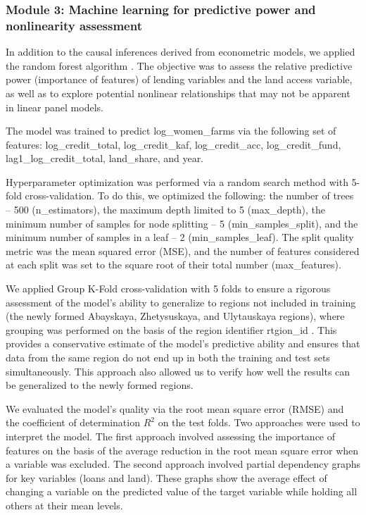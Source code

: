 ﻿\documentclass[pdflatex,sn-mathphys-ay]{sn-jnl}
\begin{document}
\subsubsection{Module 3: Machine learning for predictive power and nonlinearity assessment}

In addition to the causal inferences derived from econometric models, we
applied the random forest algorithm \citep{ref83}. The
objective was to assess the relative predictive power (importance of
features) of lending variables and the land access variable, as well as
to explore potential nonlinear relationships that may not be apparent in
linear panel models.

The model was trained to predict log\_women\_farms via the following
set of features: log\_credit\_total, log\_credit\_kaf, log\_credit\_acc,
log\_credit\_fund, lag1\_log\_credit\_total, land\_share, and year.

Hyperparameter optimization was performed via a random search method
with 5-fold cross-validation. To do this, we optimized the following:
the number of trees -- 500 (n\_estimators), the maximum depth limited to
5 (max\_depth), the minimum number of samples for node splitting -- 5
(min\_samples\_split), and the minimum number of samples in a leaf -- 2
(min\_samples\_leaf). The split quality metric was the mean squared
error (MSE), and the number of features considered at each split was set
to the square root of their total number (max\_features).

We applied Group K-Fold cross-validation with 5 folds to ensure a
rigorous assessment of the model's ability to generalize to regions not
included in training (the newly formed Abayskaya, Zhetysuskaya, and
Ulytauskaya regions), where grouping was performed on the basis of the region
identifier rtgion\_id \citep{ref65}. This provides a
conservative estimate of the model's predictive ability and ensures that
data from the same region do not end up in both the training and test
sets simultaneously. This approach also allowed us to verify how well the results
can be generalized to the newly formed regions.

We evaluated the model's quality via the root mean square error (RMSE)
and the coefficient of determination $R^2$ on the test folds. Two
approaches were used to interpret the model. The first approach involved
assessing the importance of features on the basis of the average reduction in
the root mean square error when a variable was excluded. The second
approach involved partial dependency graphs for key variables (loans and
land). These graphs show the average effect of changing a variable on
the predicted value of the target variable while holding all others at
their mean levels.
\end{document}
